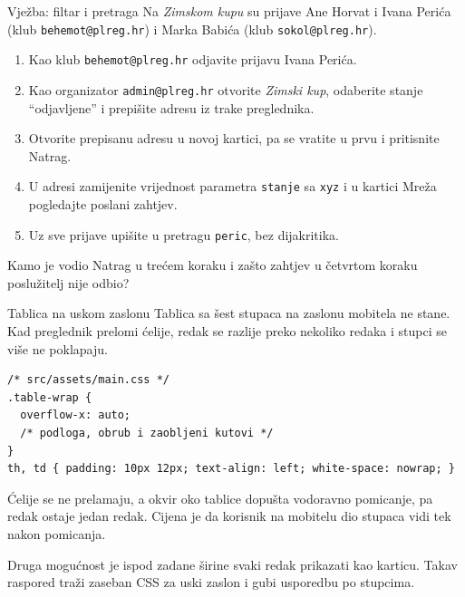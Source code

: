 \begin{frame}{Vježba: filtar i pretraga}
Na \emph{Zimskom kupu} su prijave Ane Horvat i Ivana Perića (klub \texttt{behemot@plreg.hr}) i Marka Babića (klub \texttt{sokol@plreg.hr}).

\vspace{0.6em}
\begin{enumerate}
  \itemsep0.35em
  \item Kao klub \texttt{behemot@plreg.hr} odjavite prijavu Ivana Perića.
  \item Kao organizator \texttt{admin@plreg.hr} otvorite \emph{Zimski kup}, odaberite stanje \enquote{odjavljene} i prepišite adresu iz trake preglednika.
  \item Otvorite prepisanu adresu u novoj kartici, pa se vratite u prvu i pritisnite Natrag.
  \item U adresi zamijenite vrijednost parametra \texttt{stanje} sa \texttt{xyz} i u kartici Mreža pogledajte poslani zahtjev.
  \item Uz sve prijave upišite u pretragu \texttt{peric}, bez dijakritika.
\end{enumerate}

\vspace{0.6em}
Kamo je vodio Natrag u trećem koraku i zašto zahtjev u četvrtom koraku poslužitelj nije odbio?
\end{frame}


\begin{frame}[fragile]{Tablica na uskom zaslonu}
Tablica sa šest stupaca na zaslonu mobitela ne stane. Kad preglednik prelomi ćelije, redak se razlije preko nekoliko redaka i stupci se više ne poklapaju.

\begin{lstlisting}[language=html]
/* src/assets/main.css */
.table-wrap {
  overflow-x: auto;
  /* podloga, obrub i zaobljeni kutovi */
}
th, td { padding: 10px 12px; text-align: left; white-space: nowrap; }
\end{lstlisting}

\vspace{0.2em}
Ćelije se ne prelamaju, a okvir oko tablice dopušta vodoravno pomicanje, pa redak ostaje jedan redak. Cijena je da korisnik na mobitelu dio stupaca vidi tek nakon pomicanja.

\vspace{0.2em}
Druga mogućnost je ispod zadane širine svaki redak prikazati kao karticu. Takav raspored traži zaseban CSS za uski zaslon i gubi usporedbu po stupcima.
\end{frame}

